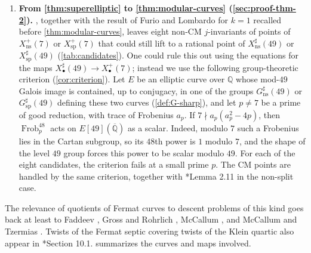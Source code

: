 \documentclass[12pt]{amsart}
\newcommand{\Q}{\mathbb{Q}}
\newcommand{\Qbar}{{\overline{\Q}}}
\DeclareMathOperator{\ns}{ns}
\DeclareMathOperator{\spc}{sp}
\newcommand{\Frob}{\operatorname{Frob}}
\numberwithin{equation}{section}
\theoremstyle{definition}
\begin{document}
\begin{enumerate}[leftmargin=*, itemsep=0.4em]
  solutions listed in \cref{thm:superelliptic}. So, via Hurwitz, the last open
  case of the $7$-adic Program B rests on Fermat's Last Theorem for exponent
  $7$.
\item \textbf{From \cref{thm:superelliptic} to \cref{thm:modular-curves}
    (\cref{sec:proof-thm-2}).} , together with the
  result of Furio and Lombardo for $k = 1$ recalled before \cref{thm:modular-curves}, leaves eight non-CM
  $j$-invariants of points of $X_{\ns}^{+}(7)$ or $X_{\spc}^{+}(7)$ that could still lift to a rational point of
  $X_{\ns}^{\sharp}(49)$ or $X_{\spc}^{\sharp}(49)$ (\cref{tab:candidates}).
  One could rule this out using the equations for the maps $X_{\bullet}^{\sharp}(49) \to X_{\bullet}^{+}(7)$; instead we
  use the following group-theoretic criterion (\cref{cor:criterion}). Let $E$ be an
  elliptic curve over $\Q$ whose mod-$49$ Galois image is contained, up to
  conjugacy, in one of the groups $G_{\ns}^{\sharp}(49)$ or
  $G_{\spc}^{\sharp}(49)$ defining these two curves (\cref{def:G-sharp}), and let
  $p \neq 7$ be a prime of good reduction, with trace of Frobenius $a_p$. If
  $7 \nmid a_p(a_p^2 - 4p)$, then $\Frob_p^{48}$ acts on $E[49](\Qbar)$ as a
  scalar. Indeed, modulo $7$ such a Frobenius lies in the Cartan subgroup, so
  its $48$th power is $1$ modulo $7$, and the shape of the level $49$ group
  forces this power to be scalar modulo $49$. For each of the eight candidates,
  the criterion fails at a small prime $p$. The CM points are handled by the
  same criterion, together with \cite{Furio--Lombardo26}*{Lemma 2.11} in the non-split
  case.
\end{enumerate}

The relevance of quotients of Fermat curves to descent problems of this kind
goes back at least to Faddeev \cite{Faddeev-61}, Gross and Rohrlich
\cite{GR-78}, McCallum \cites{McCallum-88}, and McCallum and Tzermias
\cite{MT-03}. Twists of the Fermat septic covering twists of the Klein quartic
also appear in \cite{PSS-07}*{Section 10.1}.  summarizes the
curves and maps involved.
\end{document}
